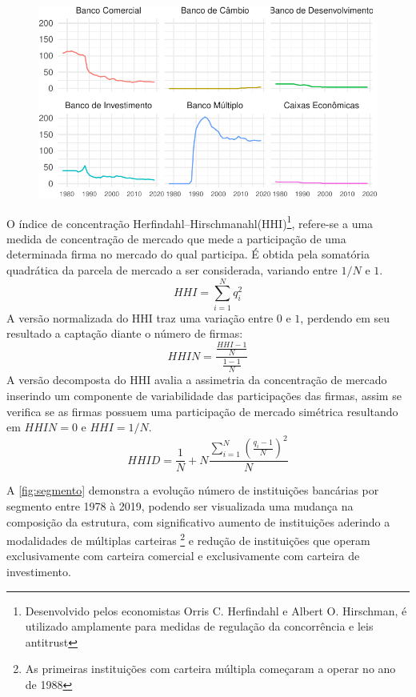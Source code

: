 \documentclass[12pt,12pt,openright,oneside,a4paper,chapter=TITLE,section=TITLE,subsection=TITLE,subsubsection=TITLE english,french,spanish,portugues,sumario=tradicional]{abntex2}
\begin{document}
\begin{figure}

\begin{center}\includegraphics{12-exportedfigures/bank evolution-1} \end{center}
\label{fig:segmento}
\end{figure}

O índice de concentração Herfindahl--Hirschmanahl(HHI)\footnote{Desenvolvido pelos economistas Orris C. Herfindahl e Albert O. Hirschman, é utilizado amplamente para medidas de regulação da concorrência e leis antitrust}, refere-se a uma medida de concentração de mercado que mede a participação de uma determinada firma no mercado do qual participa. É obtida pela somatória quadrática da parcela de mercado a ser considerada, variando entre \(1/N\) e \(1\).
\[
HHI = \sum_{i=1}^{N}q_i^2
\]
A versão normalizada do HHI traz uma variação entre \(0\) e \(1\), perdendo em seu resultado a captação diante o número de firmas:
\[
HHIN = \frac{\frac{HHI - 1}{N}}{\frac{1-1}{N}}
\]
A versão decomposta do HHI avalia a assimetria da concentração de mercado inserindo um componente de variabilidade das participações das firmas, assim se verifica se as firmas possuem uma participação de mercado simétrica resultando em \(HHIN = 0\) e \(HHI= 1/N\).
\[
HHID = \frac{1}{N} + N\frac{\sum_{i=1}^{N}(\frac{q_i - 1}{N})^2}{N}
\]

A \autoref{fig:segmento} demonstra a evolução número de instituições bancárias
por segmento entre 1978 à 2019, podendo ser visualizada uma mudança na
composição da estrutura, com significativo aumento de instituições aderindo a
modalidades de múltiplas carteiras \footnote{As primeiras instituições com
carteira múltipla começaram a operar no ano de 1988} e redução de instituições que operam exclusivamente com carteira comercial e exclusivamente com carteira
de investimento.
\end{document}
